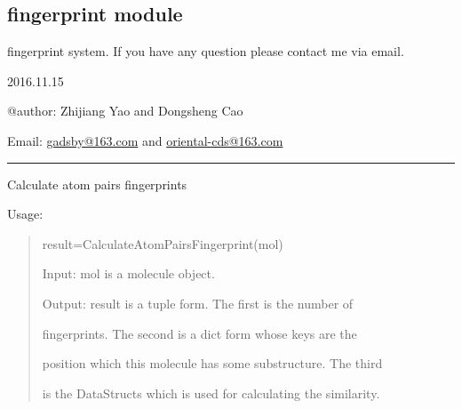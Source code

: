 \documentclass[letterpaper,10pt,english]{sphinxmanual}
\begin{document}
\subsection{fingerprint module}
\label{reference/fingerprint:module-fingerprint}\label{reference/fingerprint::doc}\label{reference/fingerprint:fingerprint-module}
fingerprint system. If you have any question please contact me via email.

2016.11.15

@author: Zhijiang Yao and Dongsheng Cao

Email: \href{mailto:gadsby@163.com}{gadsby@163.com} and \href{mailto:oriental-cds@163.com}{oriental-cds@163.com}


\bigskip\hrule{}\bigskip


\begin{fulllineitems}
\label{reference/fingerprint:fingerprint.CalculateAtomPairsFingerprint}
Calculate atom pairs fingerprints

Usage:
\begin{quote}

result=CalculateAtomPairsFingerprint(mol)

Input: mol is a molecule object.

Output: result is a tuple form. The first is the number of

fingerprints. The second is a dict form whose keys are the

position which this molecule has some substructure. The third

is the DataStructs which is used for calculating the similarity.
\end{quote}

\end{fulllineitems}

\end{document}
